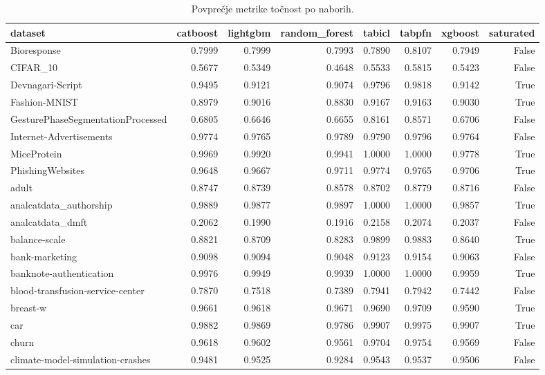 \begin{table}[htbp]
\centering
\caption{Povprečje metrike točnost po naborih.}
\label{tab:pivot}
\begin{tabular}{lrrrrrrr}
\hline
dataset & catboost & lightgbm & random\_forest & tabicl & tabpfn & xgboost & saturated \\
\hline
Bioresponse & 0.7999 & 0.7999 & 0.7993 & 0.7890 & 0.8107 & 0.7949 & False \\
CIFAR\_10 & 0.5677 & 0.5349 & 0.4648 & 0.5533 & 0.5815 & 0.5423 & False \\
Devnagari-Script & 0.9495 & 0.9121 & 0.9074 & 0.9796 & 0.9818 & 0.9142 & True \\
Fashion-MNIST & 0.8979 & 0.9016 & 0.8830 & 0.9167 & 0.9163 & 0.9030 & True \\
GesturePhaseSegmentationProcessed & 0.6805 & 0.6646 & 0.6655 & 0.8161 & 0.8571 & 0.6706 & False \\
Internet-Advertisements & 0.9774 & 0.9765 & 0.9789 & 0.9790 & 0.9796 & 0.9764 & False \\
MiceProtein & 0.9969 & 0.9920 & 0.9941 & 1.0000 & 1.0000 & 0.9778 & True \\
PhishingWebsites & 0.9648 & 0.9667 & 0.9711 & 0.9774 & 0.9765 & 0.9706 & True \\
adult & 0.8747 & 0.8739 & 0.8578 & 0.8702 & 0.8779 & 0.8716 & False \\
analcatdata\_authorship & 0.9889 & 0.9877 & 0.9897 & 1.0000 & 1.0000 & 0.9857 & True \\
analcatdata\_dmft & 0.2062 & 0.1990 & 0.1916 & 0.2158 & 0.2074 & 0.2037 & False \\
balance-scale & 0.8821 & 0.8709 & 0.8283 & 0.9899 & 0.9883 & 0.8640 & True \\
bank-marketing & 0.9098 & 0.9094 & 0.9048 & 0.9123 & 0.9154 & 0.9063 & False \\
banknote-authentication & 0.9976 & 0.9949 & 0.9939 & 1.0000 & 1.0000 & 0.9959 & True \\
blood-transfusion-service-center & 0.7870 & 0.7518 & 0.7389 & 0.7941 & 0.7942 & 0.7442 & False \\
breast-w & 0.9661 & 0.9618 & 0.9671 & 0.9690 & 0.9709 & 0.9590 & True \\
car & 0.9882 & 0.9869 & 0.9786 & 0.9907 & 0.9975 & 0.9907 & True \\
churn & 0.9618 & 0.9602 & 0.9561 & 0.9704 & 0.9754 & 0.9569 & False \\
climate-model-simulation-crashes & 0.9481 & 0.9525 & 0.9284 & 0.9543 & 0.9537 & 0.9506 & False \\

\end{tabular}
\end{table}
